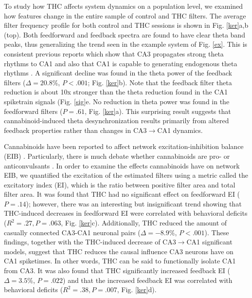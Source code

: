 \documentclass[11pt,a4paper,final]{article}
\begin{document}
To study how THC affects system dynamics on a population level, we examined how features change in the entire sample of control and THC filters.
The average filter frequency profile for both control and THC sessions is shown in Fig. \ref{ker}a,b (top).
Both feedforward and feedback spectra are found to have clear theta band peaks, thus generalizing the trend seen in the example system of Fig. \ref{ex}.
This is consistent previous reports which show that CA3 propagates strong theta rhythms to CA1 \citep{kocsis99,buzsaki02} and also that CA1 is capable to generating endogenous theta rhythms \citep{williams09}.
A significant decline was found in the theta power of the feedback filters ($\Delta=20.8\%$, $P<.001$; Fig. \ref{ker}b).
Note that the feedback filter theta reduction is about 10x stronger than the theta reduction found in the CA1 spiketrain signals (Fig. \ref{sig}e.
No reduction in theta power was found in the feedforward filters ($P=.61$, Fig. \ref{ker}a).
This surprising result suggests that cannabinoid-induced theta desynchronization results primarily from altered feedback properties rather than changes in CA3$\to$CA1 dynamics.

Cannabinoids have been reported to affect network excitation-inhibition balance (EIB) \citep{ozaita12,monory15}.
Particularly, there is much debate whether cannabinoids are pro- or anticonvulsants \citep{hill13,turkanis82,clement03,blair06,rudenko12}.
In order to examine the effects cannabinoids have on network EIB, we quantified the excitation of the estimated filters using a metric called the excitatory index (EI), which is the ratio between positive filter area and total filter area.
It was found that THC had no significant effect on feedforward EI ($P=.14$); however, there was an interesting but insignificant trend showing that THC-induced decreases in feedforward EI were correlated with behavioral deficits ($R^2=.27, P=.063$, Fig. \ref{ker}c).
Additionally, THC reduced the amount of casually connected CA3-CA1 neuronal pairs ($\Delta=-8.9\%$, $P<.001$).
These findings, together with the THC-induced decrease of CA3$\to$CA1 significant models, suggest that THC reduces the causal influence CA3 neurons have on CA1 spiketimes.
In other words, THC can be said to functionally isolate CA1 from CA3.
It was also found that THC significantly increased feedback EI ($\Delta=3.5\%$, $P=.022$) and that the increased feedback EI was correlated with behavioral deficits ($R^2=.38, P=.007$, Fig. \ref{ker}d).
\end{document}
